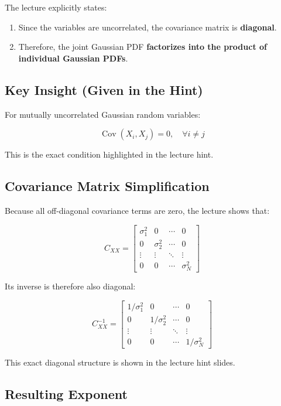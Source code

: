 \documentclass[12pt]{article}
\begin{document}
The lecture explicitly states:

\begin{enumerate}
    \item Since the variables are uncorrelated, the covariance matrix is \textbf{diagonal}.
    \item Therefore, the joint Gaussian PDF \textbf{factorizes into the product of individual Gaussian PDFs}.
\end{enumerate}

\subsection{Key Insight (Given in the Hint)}

For mutually uncorrelated Gaussian random variables:

\[
\operatorname{Cov}(X_i, X_j) = 0, \quad \forall i \neq j
\]

This is the exact condition highlighted in the lecture hint.

\subsection{Covariance Matrix Simplification}

Because all off-diagonal covariance terms are zero, the lecture shows that:

\[
C_{XX} =
\begin{bmatrix}
\sigma_1^2 & 0 & \cdots & 0 \\
0 & \sigma_2^2 & \cdots & 0 \\
\vdots & \vdots & \ddots & \vdots \\
0 & 0 & \cdots & \sigma_N^2
\end{bmatrix}
\]

Its inverse is therefore also diagonal:

\[
C_{XX}^{-1} =
\begin{bmatrix}
1/\sigma_1^2 & 0 & \cdots & 0 \\
0 & 1/\sigma_2^2 & \cdots & 0 \\
\vdots & \vdots & \ddots & \vdots \\
0 & 0 & \cdots & 1/\sigma_N^2
\end{bmatrix}
\]

This exact diagonal structure is shown in the lecture hint slides.

\subsection{Resulting Exponent}
\end{document}

